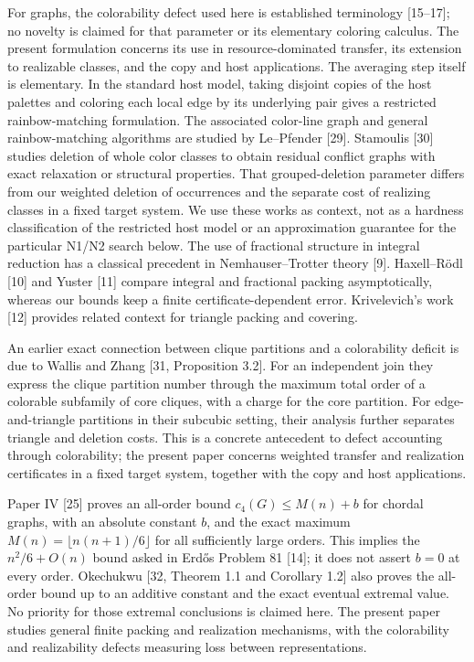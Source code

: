 \documentclass[english,11pt,a4paper]{article}
\begin{document}
For graphs, the colorability defect used here is established terminology
{[}15--17{]}; no novelty is claimed for that parameter or its elementary
coloring calculus. The present formulation concerns its use in
resource-dominated transfer, its extension to realizable classes, and
the copy and host applications. The averaging step itself is elementary.
In the standard host model, taking disjoint copies of the host palettes
and coloring each local edge by its underlying pair gives a restricted
rainbow-matching formulation. The associated color-line graph and
general rainbow-matching algorithms are studied by Le--Pfender {[}29{]}.
Stamoulis {[}30{]} studies deletion of whole color classes to obtain
residual conflict graphs with exact relaxation or structural properties.
That grouped-deletion parameter differs from our weighted deletion of
occurrences and the separate cost of realizing classes in a fixed target
system. We use these works as context, not as a hardness classification
of the restricted host model or an approximation guarantee for the
particular N1/N2 search below. The use of fractional structure in
integral reduction has a classical precedent in Nemhauser--Trotter
theory {[}9{]}. Haxell--Rödl {[}10{]} and Yuster {[}11{]} compare
integral and fractional packing asymptotically, whereas our bounds keep
a finite certificate-dependent error. Krivelevich's work {[}12{]}
provides related context for triangle packing and covering.

An earlier exact connection between clique partitions and a colorability
deficit is due to Wallis and Zhang {[}31, Proposition 3.2{]}. For an
independent join they express the clique partition number through the
maximum total order of a colorable subfamily of core cliques, with a
charge for the core partition. For edge-and-triangle partitions in their
subcubic setting, their analysis further separates triangle and deletion
costs. This is a concrete antecedent to defect accounting through
colorability; the present paper concerns weighted transfer and
realization certificates in a fixed target system, together with the
copy and host applications.

Paper IV {[}25{]} proves an all-order bound \(c_4(G)\le M(n)+b\) for
chordal graphs, with an absolute constant \(b\), and the exact maximum
\(M(n)=\lfloor n(n+1)/6\rfloor\) for all sufficiently large orders. This
implies the \(n^2/6+O(n)\) bound asked in Erdős Problem 81 {[}14{]}; it
does not assert \(b=0\) at every order. Okechukwu {[}32, Theorem 1.1 and
Corollary 1.2{]} also proves the all-order bound up to an additive
constant and the exact eventual extremal value. No priority for those
extremal conclusions is claimed here. The present paper studies general
finite packing and realization mechanisms, with the colorability and
realizability defects measuring loss between representations.
\end{document}

